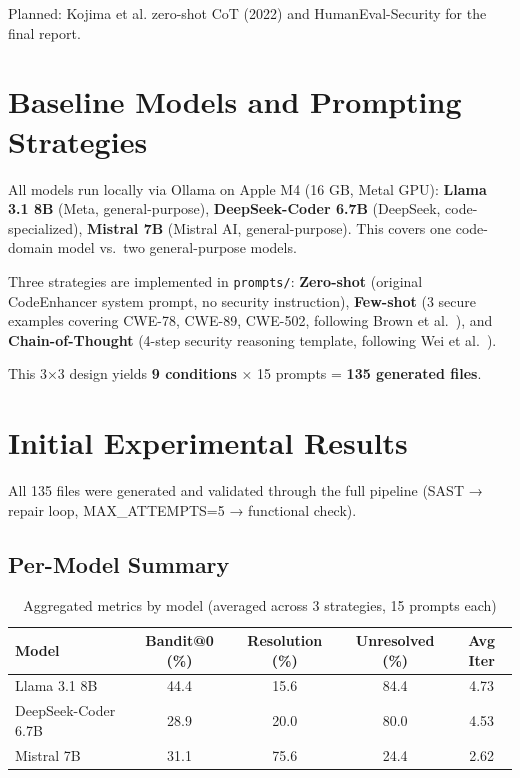 \documentclass[10pt,a4paper]{article}
\begin{document}
Planned: Kojima et al. zero-shot CoT (2022) and HumanEval-Security for the final report.

\section{Baseline Models and Prompting Strategies}

All models run locally via Ollama on Apple M4 (16 GB, Metal GPU): \textbf{Llama 3.1 8B} (Meta, general-purpose), \textbf{DeepSeek-Coder 6.7B} (DeepSeek, code-specialized), \textbf{Mistral 7B} (Mistral AI, general-purpose). This covers one code-domain model vs.\ two general-purpose models.

Three strategies are implemented in \texttt{prompts/}: \textbf{Zero-shot} (original CodeEnhancer system prompt, no security instruction), \textbf{Few-shot} (3 secure examples covering CWE-78, CWE-89, CWE-502, following Brown et al.\ \cite{brown2020gpt3}), and \textbf{Chain-of-Thought} (4-step security reasoning template, following Wei et al.\ \cite{wei2022cot}).

This 3×3 design yields \textbf{9 conditions} × 15 prompts = \textbf{135 generated files}.

\section{Initial Experimental Results}

All 135 files were generated and validated through the full pipeline (SAST → repair loop, MAX\_ATTEMPTS=5 → functional check).

\subsection*{Per-Model Summary}

\begin{table}[h]
\centering
\caption{Aggregated metrics by model (averaged across 3 strategies, 15 prompts each)}
\begin{tabular}{lcccc}
\toprule
\textbf{Model} & \textbf{Bandit@0 (\%)} & \textbf{Resolution (\%)} & \textbf{Unresolved (\%)} & \textbf{Avg Iter} \\
\midrule
Llama 3.1 8B       & 44.4 & 15.6 & 84.4 & 4.73 \\
DeepSeek-Coder 6.7B & 28.9 & 20.0 & 80.0 & 4.53 \\
Mistral 7B         & 31.1 & 75.6 & 24.4 & 2.62 \\
\bottomrule
\end{tabular}
\label{tab:model_summary}
\end{table}
\end{document}
